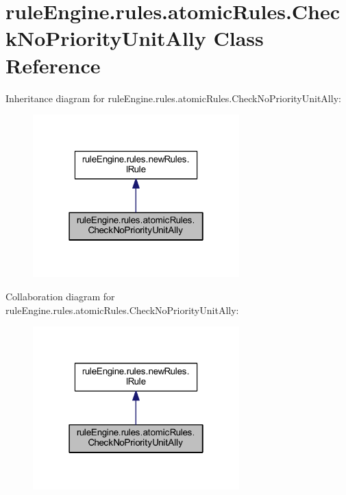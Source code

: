 \hypertarget{classrule_engine_1_1rules_1_1atomic_rules_1_1_check_no_priority_unit_ally}{}\section{rule\+Engine.\+rules.\+atomic\+Rules.\+Check\+No\+Priority\+Unit\+Ally Class Reference}
\label{classrule_engine_1_1rules_1_1atomic_rules_1_1_check_no_priority_unit_ally}


Inheritance diagram for rule\+Engine.\+rules.\+atomic\+Rules.\+Check\+No\+Priority\+Unit\+Ally\+:
\nopagebreak
\begin{figure}[H]
\begin{center}
\leavevmode
\includegraphics[width=226pt]{classrule_engine_1_1rules_1_1atomic_rules_1_1_check_no_priority_unit_ally__inherit__graph}
\end{center}
\end{figure}


Collaboration diagram for rule\+Engine.\+rules.\+atomic\+Rules.\+Check\+No\+Priority\+Unit\+Ally\+:
\nopagebreak
\begin{figure}[H]
\begin{center}
\leavevmode
\includegraphics[width=226pt]{classrule_engine_1_1rules_1_1atomic_rules_1_1_check_no_priority_unit_ally__coll__graph}
\end{center}
\end{figure}
